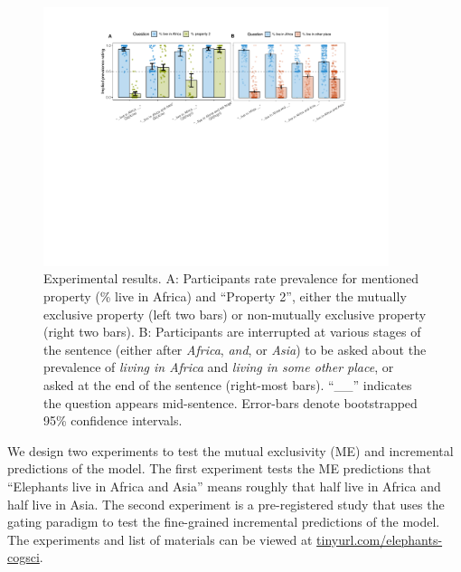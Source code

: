 \documentclass[letterpaper, 12pt]{article}
\begin{document}
\begin{figure}[t]
  \begin{center}
    \includegraphics[width=0.9\textwidth]{xprag}
  \end{center}
  \vspace{-0.55cm}
  \caption{\small Experimental results. A: Participants rate prevalence for mentioned property (\% live in Africa) and ``Property 2'', either the mutually exclusive property (left two bars) or non-mutually exclusive property (right two bars).  B: Participants are interrupted at various stages of the sentence (either after \emph{Africa}, \emph{and}, or \emph{Asia}) to be asked about the prevalence of \emph{living in Africa} and \emph{living in some other place}, or asked at the end of the sentence (right-most bars). ``\_\_'' indicates the question appears mid-sentence. Error-bars denote bootstrapped 95\% confidence intervals.}
  \label{fig:results}
    \vspace{-0.55cm}
\end{figure}

We design two experiments to test the mutual exclusivity (ME) and incremental predictions of the model. 
The first experiment tests the ME predictions that ``Elephants live in Africa and Asia'' means roughly that half live in Africa and half live in Asia.%
The second experiment is a pre-registered study that uses the gating paradigm to test the fine-grained incremental predictions of the model.
The experiments and list of materials can be viewed at \url{tinyurl.com/elephants-cogsci}.
\end{document}
